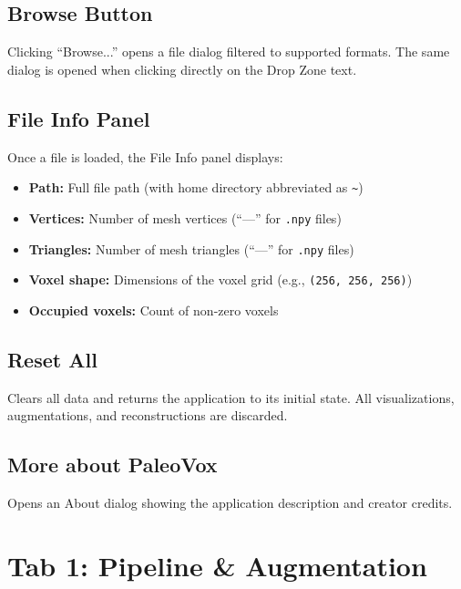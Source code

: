 \documentclass[12pt,a4paper]{article}
\begin{document}
\subsection{Browse Button}

Clicking ``Browse...'' opens a file dialog filtered to supported formats. The same dialog is opened when clicking directly on the Drop Zone text.

\subsection{File Info Panel}

Once a file is loaded, the File Info panel displays:

\begin{itemize}
  \item \textbf{Path:} Full file path (with home directory abbreviated as \texttt{\~{}})
  \item \textbf{Vertices:} Number of mesh vertices (``---'' for \texttt{.npy} files)
  \item \textbf{Triangles:} Number of mesh triangles (``---'' for \texttt{.npy} files)
  \item \textbf{Voxel shape:} Dimensions of the voxel grid (e.g., \texttt{(256, 256, 256)})
  \item \textbf{Occupied voxels:} Count of non-zero voxels
\end{itemize}

\subsection{Reset All}

Clears all data and returns the application to its initial state. All visualizations, augmentations, and reconstructions are discarded.

\subsection{More about PaleoVox}

Opens an About dialog showing the application description and creator credits.

\section{Tab 1: Pipeline \& Augmentation}
\end{document}
